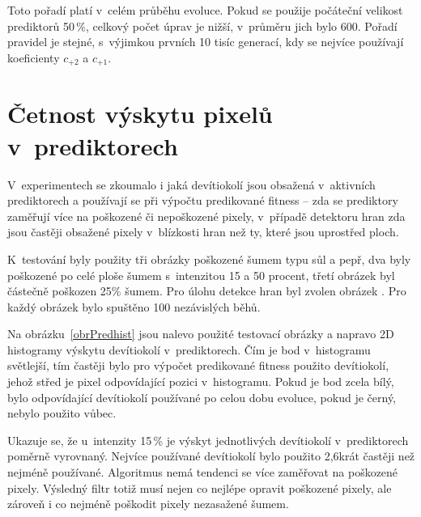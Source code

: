 Toto pořadí platí v~celém průběhu evoluce. Pokud se použije počáteční velikost prediktorů 50\,\%, celkový počet úprav je nižší, v~průměru jich bylo 600. Pořadí pravidel je stejné, s~výjimkou prvních 10 tisíc generací, kdy se nejvíce používají koeficienty $c_{+2}$ a $c_{+1}$.



\section{Četnost výskytu pixelů v~prediktorech}
\label{secExpPredhist}

V~experimentech se zkoumalo i jaká devítiokolí jsou obsažená v~aktivních prediktorech a používají se při výpočtu predikované fitness -- zda se prediktory zaměřují více na poškozené či nepoškozené pixely, v~případě detektoru hran zda jsou častěji obsažené pixely v~blízkosti hran než ty, které jsou uprostřed ploch.

K~testování byly použity tři obrázky poškozené šumem typu sůl a pepř, dva byly poškozené po celé ploše šumem s~intenzitou 15 a 50 procent, třetí obrázek byl částečně poškozen 25\% šumem. Pro úlohu detekce hran byl zvolen obrázek . Pro každý obrázek bylo spuštěno 100 nezávislých běhů.

Na obrázku~\ref{obrPredhist} jsou nalevo použité testovací obrázky a napravo 2D histogramy výskytu devítiokolí v~prediktorech. Čím je bod v~histogramu světlejší, tím častěji bylo pro výpočet predikované fitness použito devítiokolí, jehož střed je pixel odpovídající pozici v~histogramu. Pokud je bod zcela bílý, bylo odpovídající devítiokolí používané po celou dobu evoluce, pokud je černý, nebylo použito vůbec.

Ukazuje se, že u~intenzity 15\,\% je výskyt jednotlivých devítiokolí v~prediktorech poměrně vyrovnaný. Nejvíce používané devítiokolí bylo použito 2,6krát častěji než nejméně používané. Algoritmus nemá tendenci se více zaměřovat na poškozené pixely. Výsledný filtr totiž musí nejen co nejlépe opravit poškozené pixely, ale zároveň i co nejméně poškodit pixely nezasažené šumem.

